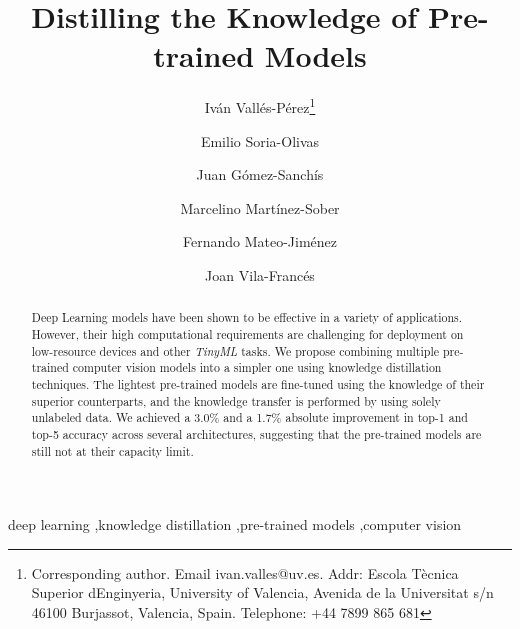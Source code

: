 \documentclass{elsarticle}
\begin{document}
	\begin{frontmatter}
		\title{Distilling the Knowledge of Pre-trained Models}
		\author[UV]{Iván Vallés-Pérez\footnote{Corresponding author. Email ivan.valles@uv.es. Addr: Escola Tècnica Superior d\textsc{}Enginyeria, University of Valencia, Avenida de la Universitat s/n 46100 Burjassot, Valencia, Spain. Telephone: +44 7899 865 681}}
		\author[UV]{Emilio Soria-Olivas}
		\author[UV]{Juan Gómez-Sanchís}
		\author[UV]{Marcelino Martínez-Sober}%
		\author[UV]{Fernando Mateo-Jiménez}
		\author[UV]{Joan Vila-Francés}
		\address[UV]{Escola Tècnica Superior d\textsc{}Enginyeria, University of Valencia, Avenida de la Universitat s/n 46100 Burjassot, Valencia, Spain. %
		}

		\begin{abstract}
		Deep Learning models have been shown to be effective in a variety of  applications. However, their high computational requirements are challenging for deployment on low-resource devices and other \textit{TinyML} tasks. We propose combining multiple pre-trained computer vision models into a simpler one using knowledge distillation techniques. The lightest pre-trained models are fine-tuned using the knowledge of their superior counterparts, and the knowledge transfer is performed by using solely unlabeled data. We achieved a 3.0\% and a 1.7\% absolute improvement in top-1 and top-5 accuracy across several architectures, suggesting that the pre-trained models are still not at their capacity limit. %
		\end{abstract}

		\begin{keyword}
			deep learning \sep knowledge distillation \sep pre-trained models \sep computer vision
		\end{keyword}

	\end{frontmatter}
\end{document}
